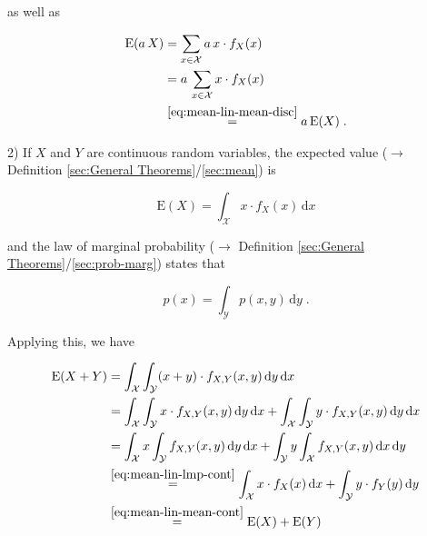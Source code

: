\documentclass[a4paper,12pt,twoside]{book}
\begin{document}
as well as

\begin{equation} \label{eq:mean-lin-mean-lin-s2-disc}
\begin{split}
\mathrm{E}(a\,X) &= \sum_{x \in \mathcal{X}} a \, x \cdot f_X(x) \\
&= a \, \sum_{x \in \mathcal{X}} x \cdot f_X(x) \\
&\overset{\eqref{eq:mean-lin-mean-disc}}{=} a \, \mathrm{E}(X) \; .
\end{split}
\end{equation}

\vspace{1em}
2) If $X$ and $Y$ are continuous random variables, the expected value ($\rightarrow$ Definition \ref{sec:General Theorems}/\ref{sec:mean}) is

\begin{equation} \label{eq:mean-lin-mean-cont}
\mathrm{E}(X) = \int_{\mathcal{X}} x \cdot f_X(x) \, \mathrm{d}x
\end{equation}

and the law of marginal probability ($\rightarrow$ Definition \ref{sec:General Theorems}/\ref{sec:prob-marg}) states that

\begin{equation} \label{eq:mean-lin-lmp-cont}
p(x) = \int_{\mathcal{Y}} p(x,y) \, \mathrm{d}y \; .
\end{equation}

Applying this, we have

\begin{equation} \label{eq:mean-lin-mean-lin-s1-cont}
\begin{split}
\mathrm{E}(X + Y) &= \int_{\mathcal{X}} \int_{\mathcal{Y}} (x+y) \cdot f_{X,Y}(x,y) \, \mathrm{d}y \, \mathrm{d}x \\
&= \int_{\mathcal{X}} \int_{\mathcal{Y}} x \cdot f_{X,Y}(x,y) \, \mathrm{d}y \, \mathrm{d}x + \int_{\mathcal{X}} \int_{\mathcal{Y}} y \cdot f_{X,Y}(x,y) \, \mathrm{d}y \, \mathrm{d}x \\
&= \int_{\mathcal{X}} x \int_{\mathcal{Y}} f_{X,Y}(x,y) \, \mathrm{d}y \, \mathrm{d}x + \int_{\mathcal{Y}} y \int_{\mathcal{X}} f_{X,Y}(x,y) \, \mathrm{d}x \, \mathrm{d}y \\
&\overset{\eqref{eq:mean-lin-lmp-cont}}{=} \int_{\mathcal{X}} x \cdot f_X(x) \, \mathrm{d}x + \int_{\mathcal{Y}} y \cdot f_Y(y) \, \mathrm{d}y \\
&\overset{\eqref{eq:mean-lin-mean-cont}}{=} \mathrm{E}(X) + \mathrm{E}(Y)
\end{split}
\end{equation}
\end{document}
